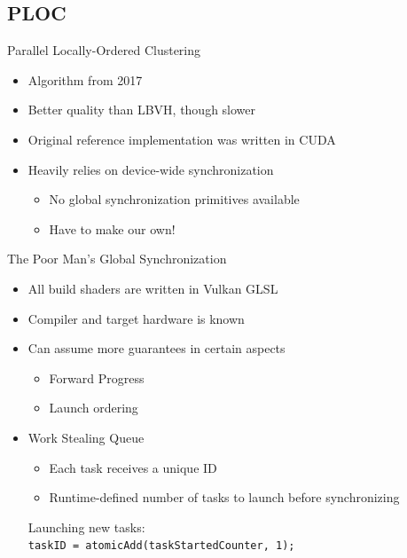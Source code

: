 \documentclass[aspectratio=169,t]{beamer}
\begin{document}
\subsection{PLOC}

\begin{slide}{Parallel Locally-Ordered Clustering}
  \begin{itemize}
   \item Algorithm from 2017
   \item Better quality than LBVH, though slower
   \item Original reference implementation was written in CUDA
   \item Heavily relies on device-wide synchronization
   \begin{itemize}
    \item No global synchronization primitives available
    \item Have to make our own!
   \end{itemize}
  \end{itemize}
\end{slide}

\begin{slide}{The Poor Man's Global Synchronization}
  \begin{itemize}
   \item All build shaders are written in Vulkan GLSL
   \item Compiler and target hardware is known
   \item Can assume more guarantees in certain aspects
   \begin{itemize}
    \item Forward Progress
    \item Launch ordering
   \end{itemize}
   \item Work Stealing Queue
   \begin{itemize}
    \item Each task receives a unique ID
    \item Runtime-defined number of tasks to launch before synchronizing
   \end{itemize}
   Launching new tasks:\\
   \pause
   \texttt{taskID = atomicAdd(taskStartedCounter, 1);}\\
  \end{itemize}
\end{slide}
\end{document}
